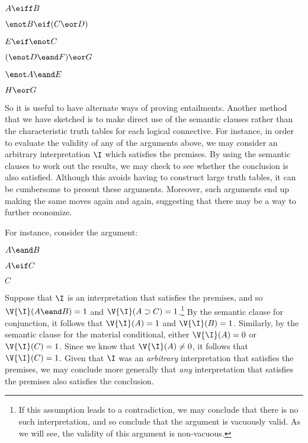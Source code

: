 \label{8letterargument}
\begin{earg}
\item[] $A\eiff B$
\item[] $\enot B \eif (C \eor D)$
\item[] $E \eif \enot C$
\item[] $(\enot D \eand F) \eor G$
\item[] $\enot A \eand E$
\item[\therefore] $H \eor G$
\end{earg}

So it is useful to have alternate ways of proving entailments.
Another method that we have sketched is to make direct use of the semantic clauses rather than the characteristic truth tables for each logical connective.
For instance, in order to evaluate the validity of any of the arguments above, we may consider an arbitrary interpretation $\I$ which satisfies the premises.
By using the semantic clauses to work out the results, we may check to see whether the conclusion is also satisfied.
Although this avoids having to construct large truth tables, it can be cumbersome to present these arguments.
Moreover, such arguments end up making the same moves again and again, suggesting that there may be a way to further economize.

For instance, consider the argument:

\begin{earg}
  \item[] $A \eand B$
  \item[] $A \eif C$
  \item[\therefore] $C$
\end{earg}

Suppose that $\I$ is an interpretation that satisfies the premises, and so $\V{\I}(A \eand B)=1$ and $\V{\I}(A \supset C)=1$.\footnote{If this assumption leads to a contradiction, we may conclude that there is no such interpretation, and so conclude that the argument is vacuously valid. As we will see, the validity of this argument is non-vacuous.}
By the semantic clause for conjunction, it follows that $\V{\I}(A)=1$ and $\V{\I}(B)=1$.
Similarly, by the semantic clause for the material conditional, either $\V{\I}(A)=0$ or $\V{\I}(C)=1$.
Since we know that $\V{\I}(A)\neq 0$, it follows that $\V{\I}(C)=1$.
Given that $\I$ was an \textit{arbitrary} interpretation that satisfies the premises, we may conclude more generally that \textit{any} interpretation that satisfies the premises also satisfies the conclusion.

